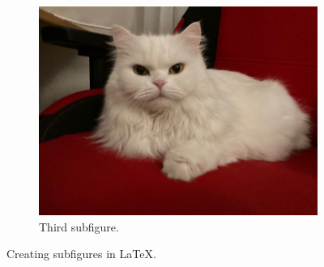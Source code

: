 \documentclass{article}
\begin{document}
\begin{figure}
\begin{subfigure}{0.4\textwidth}
    \includegraphics[width=\textwidth]{Bilder/Katze}
    \caption{Third subfigure.}
    \label{fig:third}
\end{subfigure}
        
\caption{Creating subfigures in \LaTeX.}
\label{fig:figures}
\end{figure}
\end{document}
